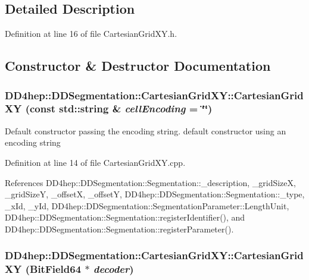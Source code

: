 \subsection{Detailed Description}


Definition at line 16 of file CartesianGridXY.h.

\subsection{Constructor \& Destructor Documentation}
\hypertarget{class_d_d4hep_1_1_d_d_segmentation_1_1_cartesian_grid_x_y_a7fe8b00de8abcee4e8cbfc71b8ee6c32}{
\subsubsection[{CartesianGridXY}]{\setlength{\rightskip}{0pt plus 5cm}DD4hep::DDSegmentation::CartesianGridXY::CartesianGridXY (const std::string \& {\em cellEncoding} = {\ttfamily \char`\"{}\char`\"{}})}}
\label{class_d_d4hep_1_1_d_d_segmentation_1_1_cartesian_grid_x_y_a7fe8b00de8abcee4e8cbfc71b8ee6c32}


Default constructor passing the encoding string. default constructor using an encoding string 

Definition at line 14 of file CartesianGridXY.cpp.

References DD4hep::DDSegmentation::Segmentation::\_\-description, \_\-gridSizeX, \_\-gridSizeY, \_\-offsetX, \_\-offsetY, DD4hep::DDSegmentation::Segmentation::\_\-type, \_\-xId, \_\-yId, DD4hep::DDSegmentation::SegmentationParameter::LengthUnit, DD4hep::DDSegmentation::Segmentation::registerIdentifier(), and DD4hep::DDSegmentation::Segmentation::registerParameter().\hypertarget{class_d_d4hep_1_1_d_d_segmentation_1_1_cartesian_grid_x_y_a1df3c8a66b3c58d8d93ede3db742a5c6}{
\subsubsection[{CartesianGridXY}]{\setlength{\rightskip}{0pt plus 5cm}DD4hep::DDSegmentation::CartesianGridXY::CartesianGridXY ({\bf BitField64} $\ast$ {\em decoder})}}
\label{class_d_d4hep_1_1_d_d_segmentation_1_1_cartesian_grid_x_y_a1df3c8a66b3c58d8d93ede3db742a5c6}


